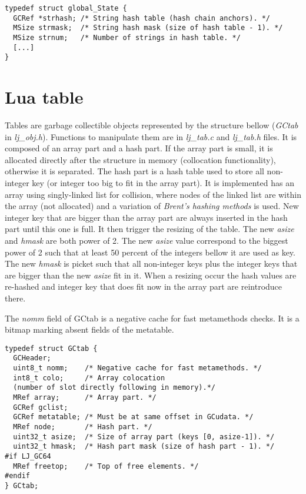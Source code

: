 \begin{lstlisting}[style=CStyle]
typedef struct global_State {
  GCRef *strhash; /* String hash table (hash chain anchors). */
  MSize strmask;  /* String hash mask (size of hash table - 1). */
  MSize strnum;   /* Number of strings in hash table. */
  [...]
}
\end{lstlisting}


\section{Lua table}
\label{Sec:table}

Tables are garbage collectible objects represented by the structure bellow
(\emph{GCtab} in \emph{lj\_obj.h}). Functions to manipulate them are in
\emph{lj\_tab.c} and \emph{lj\_tab.h} files. It is composed of an array part and
a hash part. If the array part is small, it is allocated directly after the
structure in memory (collocation functionality), otherwise it is separated. The
hash part is a hash table used to store all non-integer key (or integer too big
to fit in the array part). It is implemented has an array using singly-linked
list for collision, where nodes of the linked list are within the array (not
allocated) and a variation of \emph{Brent's hashing methods} is used.
New integer key that are bigger than the array part are always inserted
in the hash part until this one is full. It then trigger the resizing of the
table. The new \emph{asize} and \emph{hmask} are both power of 2. The
new \emph{asize} value correspond to the biggest power of 2 such that at least
50 percent of the integers bellow it are used as key. The new \emph{hmask} is
picket such that all non-integer keys plus the integer keys that are bigger than
the new \emph{asize} fit in it. When a resizing occur the hash values are
re-hashed and integer key that does fit now in the array part are reintroduce
there.

The \emph{nomm} field of GCtab is a
negative cache for fast metamethods checks. It is a bitmap marking absent fields
of the metatable.

\begin{lstlisting}[style=CStyle]
typedef struct GCtab {
  GCHeader;
  uint8_t nomm;    /* Negative cache for fast metamethods. */
  int8_t colo;     /* Array colocation
  (number of slot directly following in memory).*/
  MRef array;      /* Array part. */
  GCRef gclist;
  GCRef metatable; /* Must be at same offset in GCudata. */
  MRef node;       /* Hash part. */
  uint32_t asize;  /* Size of array part (keys [0, asize-1]). */
  uint32_t hmask;  /* Hash part mask (size of hash part - 1). */
#if LJ_GC64
  MRef freetop;    /* Top of free elements. */
#endif
} GCtab;
\end{lstlisting}

